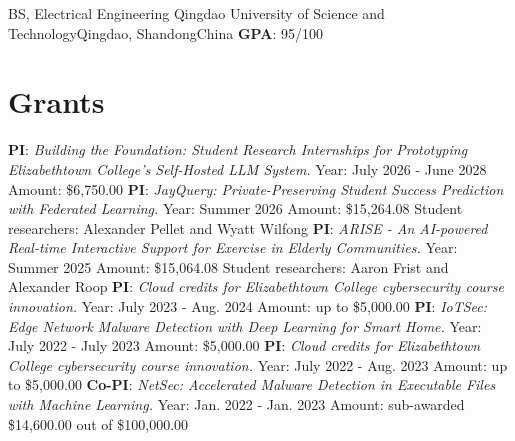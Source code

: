 \documentclass[11pt]{moderncv}
\begin{document}
        {BS, Electrical Engineering}
        {Qingdao University of Science and Technology}{Qingdao, Shandong}{China}
        {\textbf{GPA}: 95/100        
        }

\section{Grants}
%
{\textbf{PI}: \textit{Building the Foundation: Student Research Internships for Prototyping Elizabethtown College’s Self-Hosted LLM System.} \newline
	Year: July 2026 - June 2028 \newline
	Amount: \$6,750.00
}
%
{\textbf{PI}: \textit{JayQuery: Private-Preserving Student Success Prediction with Federated Learning.} \newline
	Year: Summer 2026 \newline
	Amount: \$15,264.08 \newline
	Student researchers: Alexander Pellet and Wyatt Wilfong
}
%
{\textbf{PI}: \textit{ARISE - An AI-powered Real-time Interactive Support for Exercise in Elderly Communities.} \newline
	Year: Summer 2025 \newline
	Amount: \$15,064.08 \newline
	Student researchers: Aaron Frist and Alexander Roop
}
%
{\textbf{PI}: \textit{Cloud credits for Elizabethtown College cybersecurity course innovation.} \newline
	Year: July 2023 - Aug. 2024 \newline
	Amount: up to \$5,000.00
}
%
{\textbf{PI}: \textit{IoTSec: Edge Network Malware Detection with Deep Learning for Smart Home.} \newline
	Year: July 2022 - July 2023 \newline
	Amount: \$5,000.00
}
%
{\textbf{PI}: \textit{Cloud credits for Elizabethtown College cybersecurity course innovation.} \newline
	Year: July 2022 - Aug. 2023 \newline
	Amount: up to \$5,000.00
}
%
{\textbf{Co-PI}: \textit{NetSec: Accelerated Malware Detection in Executable Files with Machine Learning.} \newline
	Year: Jan. 2022 - Jan. 2023 \newline
	Amount: sub-awarded \$14,600.00 out of \$100,000.00
}
\end{document}
